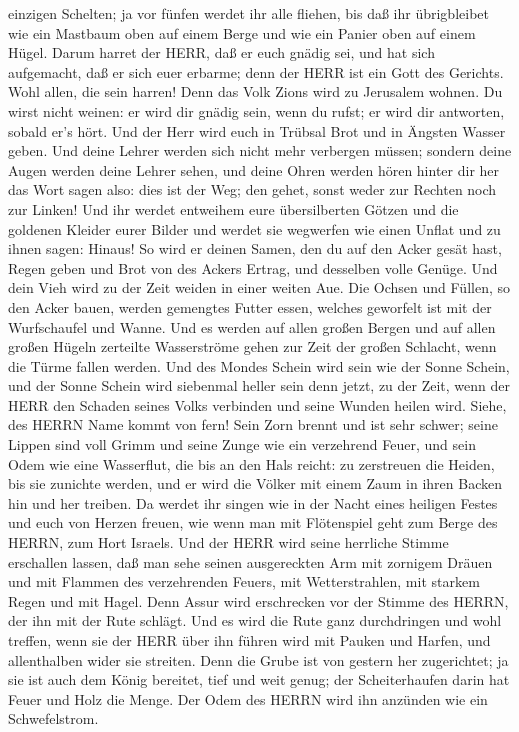 einzigen Schelten; ja vor fünfen werdet ihr alle fliehen, bis daß ihr
übrigbleibet wie ein Mastbaum oben auf einem Berge und wie ein Panier
oben auf einem Hügel.  Darum harret der HERR, daß er euch
gnädig sei, und hat sich aufgemacht, daß er sich euer erbarme; denn der
HERR ist ein Gott des Gerichts. Wohl allen, die sein harren!
 Denn das Volk Zions wird zu Jerusalem wohnen. Du wirst
nicht weinen: er wird dir gnädig sein, wenn du rufst; er wird dir
antworten, sobald er's hört.  Und der Herr wird euch in
Trübsal Brot und in Ängsten Wasser geben. Und deine Lehrer werden sich
nicht mehr verbergen müssen; sondern deine Augen werden deine Lehrer
sehen,  und deine Ohren werden hören hinter dir her das
Wort sagen also: dies ist der Weg; den gehet, sonst weder zur Rechten
noch zur Linken!  Und ihr werdet entweihem eure
übersilberten Götzen und die goldenen Kleider eurer Bilder und werdet
sie wegwerfen wie einen Unflat und zu ihnen sagen: Hinaus! 
So wird er deinen Samen, den du auf den Acker gesät hast, Regen geben
und Brot von des Ackers Ertrag, und desselben volle Genüge. Und dein
Vieh wird zu der Zeit weiden in einer weiten Aue.  Die
Ochsen und Füllen, so den Acker bauen, werden gemengtes Futter essen,
welches geworfelt ist mit der Wurfschaufel und Wanne.  Und
es werden auf allen großen Bergen und auf allen großen Hügeln zerteilte
Wasserströme gehen zur Zeit der großen Schlacht, wenn die Türme fallen
werden.  Und des Mondes Schein wird sein wie der Sonne
Schein, und der Sonne Schein wird siebenmal heller sein denn jetzt, zu
der Zeit, wenn der HERR den Schaden seines Volks verbinden und seine
Wunden heilen wird.  Siehe, des HERRN Name kommt von fern!
Sein Zorn brennt und ist sehr schwer; seine Lippen sind voll Grimm und
seine Zunge wie ein verzehrend Feuer,  und sein Odem wie
eine Wasserflut, die bis an den Hals reicht: zu zerstreuen die Heiden,
bis sie zunichte werden, und er wird die Völker mit einem Zaum in ihren
Backen hin und her treiben.  Da werdet ihr singen wie in
der Nacht eines heiligen Festes und euch von Herzen freuen, wie wenn man
mit Flötenspiel geht zum Berge des HERRN, zum Hort Israels.
 Und der HERR wird seine herrliche Stimme erschallen
lassen, daß man sehe seinen ausgereckten Arm mit zornigem Dräuen und mit
Flammen des verzehrenden Feuers, mit Wetterstrahlen, mit starkem Regen
und mit Hagel.  Denn Assur wird erschrecken vor der Stimme
des HERRN, der ihn mit der Rute schlägt.  Und es wird die
Rute ganz durchdringen und wohl treffen, wenn sie der HERR über ihn
führen wird mit Pauken und Harfen, und allenthalben wider sie streiten.
 Denn die Grube ist von gestern her zugerichtet; ja sie ist
auch dem König bereitet, tief und weit genug; der Scheiterhaufen darin
hat Feuer und Holz die Menge. Der Odem des HERRN wird ihn anzünden wie
ein Schwefelstrom.

